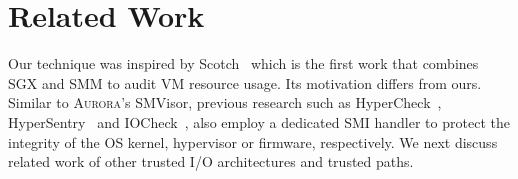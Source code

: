 %


\section{Related Work}
Our technique was inspired by Scotch~\cite{DBLP:conf/raid/LeachZW17} which is the first work that combines SGX and SMM to audit VM resource usage. Its motivation differs from ours.
Similar to \textsc{Aurora}'s SMVisor, previous research such as HyperCheck~\cite{DBLP:conf/raid/WangSG10}, HyperSentry~\cite{DBLP:conf/ccs/AzabNWJZS10} and IOCheck~\cite{DBLP:conf/esorics/ZhangWLS14}, also employ a dedicated SMI handler to protect the integrity of the OS kernel, hypervisor or firmware, respectively.
We next discuss related work of other trusted I/O architectures and trusted paths.

